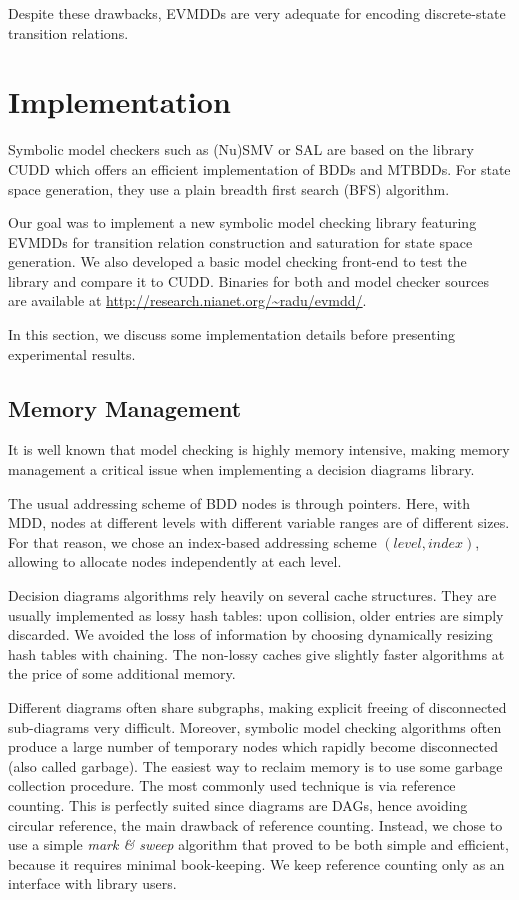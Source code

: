 \documentclass[a4paper,oneside,11pt,pdftex]{llncs}
\begin{document}
Despite these drawbacks, EVMDDs are very adequate for encoding discrete-state transition relations.

\section{Implementation}

Symbolic model checkers such as (Nu)SMV\cite{NuSMV} or SAL\cite{SAL}
are based on the library CUDD\cite{CUDD} which offers an efficient
implementation of BDDs and MTBDDs. For state space generation, they
use a plain breadth first search (BFS) algorithm.

Our goal was to implement a new symbolic model checking library featuring
EVMDDs for transition relation construction and saturation\cite{Saturation2001}
for state space generation. We also developed a basic
model checking front-end to test the library and compare it to CUDD.
Binaries for both and model checker sources are available
at \url{http://research.nianet.org/~radu/evmdd/}.

In this section, we discuss some implementation details
before presenting experimental results.

\subsection{Memory Management}

It is well known that model checking is highly memory intensive,
making memory management a critical issue when implementing
a decision diagrams library.

The usual addressing scheme of BDD nodes is through pointers.
Here, with MDD, nodes at different levels with different
variable ranges are of different sizes. For that reason, we chose
an index-based addressing scheme $(level, index)$, allowing to allocate nodes
independently at each level.

Decision diagrams algorithms rely heavily on several cache structures.
They are usually implemented as lossy hash tables: upon collision, older entries
are simply discarded. 
We avoided the loss of information by choosing dynamically resizing hash tables with chaining.
The non-lossy caches give slightly faster algorithms at the price
of some additional memory.

Different diagrams often share subgraphs, making explicit freeing
of disconnected sub-diagrams very difficult. Moreover,
symbolic model checking algorithms often produce a large number of temporary
nodes which rapidly become disconnected (also called garbage). 
The easiest way to reclaim
memory is to use some garbage collection procedure.
The most commonly used technique is via reference counting.
This is perfectly suited since diagrams are DAGs, hence avoiding
circular reference, the main drawback of reference counting. 
Instead, we chose to use a simple \emph{mark \& sweep} algorithm that proved
to be both simple and efficient, because it requires minimal book-keeping.
We keep reference counting only as an interface with library users.
\end{document}
